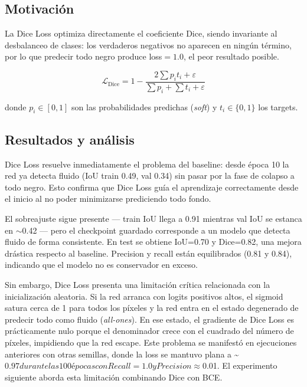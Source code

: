 \documentclass[12pt,a4paper]{article}
\begin{document}
\subsection{Motivación}

La Dice Loss optimiza directamente el coeficiente Dice, siendo invariante al desbalanceo de clases: los verdaderos negativos no aparecen en ningún término, por lo que predecir todo negro produce loss$=1.0$, el peor resultado posible.

\begin{equation}
    \mathcal{L}_{\text{Dice}} = 1 - \frac{2\sum p_i t_i + \varepsilon}{\sum p_i + \sum t_i + \varepsilon}
\end{equation}

donde $p_i \in [0,1]$ son las probabilidades predichas (\textit{soft}) y $t_i \in \{0,1\}$ los targets.

\subsection{Resultados y análisis}

Dice Loss resuelve inmediatamente el problema del baseline: desde época 10 la red ya detecta fluido (IoU train 0.49, val 0.34) sin pasar por la fase de colapso a todo negro. Esto confirma que Dice Loss guía el aprendizaje correctamente desde el inicio al no poder minimizarse prediciendo todo fondo.

El sobreajuste sigue presente — train IoU llega a 0.91 mientras val IoU se estanca en $\sim$0.42 — pero el checkpoint guardado corresponde a un modelo que detecta fluido de forma consistente. En test se obtiene IoU=0.70 y Dice=0.82, una mejora drástica respecto al baseline. Precision y recall están equilibrados (0.81 y 0.84), indicando que el modelo no es conservador en exceso.

Sin embargo, Dice Loss presenta una limitación crítica relacionada con la inicialización aleatoria. Si la red arranca con logits positivos altos, el sigmoid satura cerca de 1 para todos los píxeles y la red entra en el estado degenerado de predecir todo como fluido (\textit{all-ones}). En ese estado, el gradiente de Dice Loss es prácticamente nulo porque el denominador crece con el cuadrado del número de píxeles, impidiendo que la red escape. Este problema se manifestó en ejecuciones anteriores con otras semillas, donde la loss se mantuvo plana a \sim$0.97 durante las 100 épocas con Recall=1.0 y Precision \approx$0.01. El experimento siguiente aborda esta limitación combinando Dice con BCE.
\end{document}
